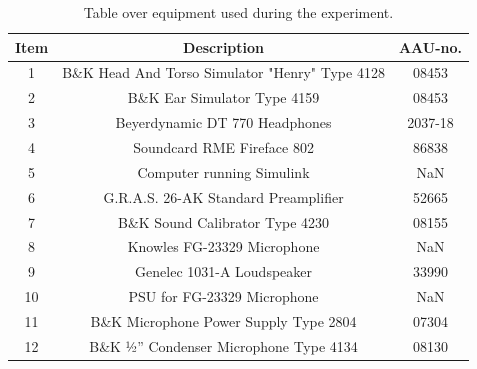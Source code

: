 \begin{table}[H]
	\centering
	\begin{tabular}{ c c c } \toprule
		{Item}	& {Description} 						& {AAU-no}. \\ \bottomrule 
		1	&	B\&K Head And Torso Simulator "Henry" Type 4128	& 08453	\\
		2	&	B\&K Ear Simulator Type 4159			& 08453		\\
		3	&	Beyerdynamic DT 770 Headphones				& 2037-18		\\
		4	&	Soundcard RME Fireface 802					& 86838		\\
		5	&	Computer running Simulink								& NaN		\\
		6	&	G.R.A.S. 26-AK Standard Preamplifier		& 52665		\\
		7	&	B\&K Sound Calibrator Type 4230				& 08155		\\ 
		8	&	Knowles FG-23329 Microphone					& NaN		\\
		9	&	Genelec 1031-A Loudspeaker								& 33990		\\ 
		10	&	PSU for FG-23329  Microphone	& NaN\\
		11	& 	B\&K Microphone Power Supply Type 2804		& 07304		\\
		12	&	B\&K ½'' Condenser Microphone Type 4134 	& 08130		\\
		\bottomrule
	\end{tabular}
	\caption{Table over equipment used during the experiment.}
	\label{tab:AngleOfIncideceHP}
\end{table}


